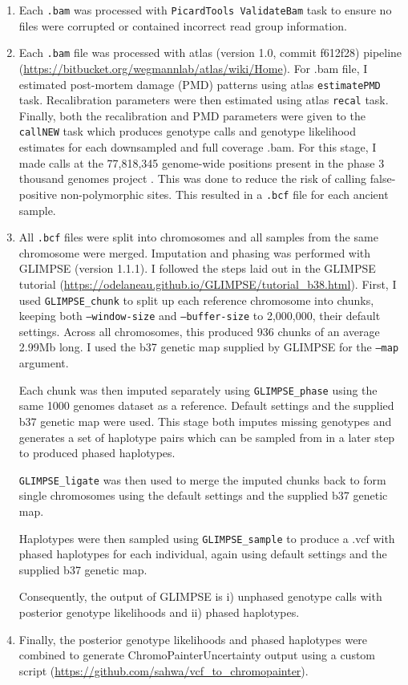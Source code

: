\begin{enumerate}
\item Each \texttt{.bam} was processed with \texttt{PicardTools ValidateBam} \cite{Picard2018toolkit} task to ensure no files were corrupted or contained incorrect read group information.
\item Each \texttt{.bam} file was processed with atlas (version 1.0, commit f612f28) pipeline \cite{Link2017} (\url{https://bitbucket.org/wegmannlab/atlas/wiki/Home}). For .bam file, I estimated post-mortem damage (PMD) patterns using atlas \texttt{estimatePMD} task. Recalibration parameters were then estimated using atlas \texttt{recal} task. Finally, both the recalibration and PMD parameters were given to the \texttt{callNEW} task which produces genotype calls and genotype likelihood estimates for each downsampled and full coverage .bam. For this stage, I made calls at the 77,818,345 genome-wide positions present in the phase 3 thousand genomes project \cite{1000GenomesProjectConsortium2015}. This was done to reduce the risk of calling false-positive non-polymorphic sites. This resulted in a \texttt{.bcf} file for each ancient sample. 
\item All \texttt{.bcf} files were split into chromosomes and all samples from the same chromosome were merged. Imputation and phasing was performed with GLIMPSE (version 1.1.1). I followed the steps laid out in the GLIMPSE tutorial (\url{https://odelaneau.github.io/GLIMPSE/tutorial_b38.html}). First, I used \texttt{GLIMPSE\_chunk} to split up each reference chromosome into chunks, keeping both \texttt{--window-size} and \texttt{--buffer-size} to 2,000,000, their default settings. Across all chromosomes, this produced 936 chunks of an average 2.99Mb long. I used the b37 genetic map supplied by GLIMPSE for the \texttt{--map} argument. 

Each chunk was then imputed separately using \texttt{GLIMPSE\_phase} using the same 1000 genomes dataset as a reference. Default settings and the supplied b37 genetic map were used. This stage both imputes missing genotypes and generates a set of haplotype pairs which can be sampled from in a later step to produced phased haplotypes.

\texttt{GLIMPSE\_ligate} was then used to merge the imputed chunks back to form single chromosomes using the default settings and the supplied b37 genetic map. 

Haplotypes were then sampled using \texttt{GLIMPSE\_sample} to produce a .vcf with phased haplotypes for each individual, again using default settings and the supplied b37 genetic map. 

Consequently, the output of GLIMPSE is i) unphased genotype calls with posterior genotype likelihoods and ii) phased haplotypes.


\item Finally, the posterior genotype likelihoods and phased haplotypes were combined to generate ChromoPainterUncertainty output using a custom script (\url{https://github.com/sahwa/vcf_to_chromopainter}).



\end{enumerate}



